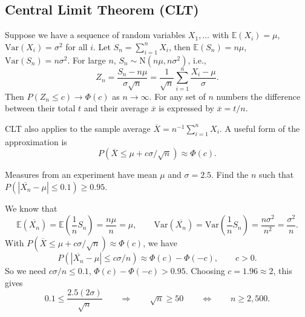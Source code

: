 \documentclass[letter-paper]{tufte-book}
\newenvironment{example}[1][Example]{\begin{trivlist}
\item[\hskip \labelsep {\bfseries #1}]}{\end{trivlist}}
\begin{document}

\subsection{Central Limit Theorem (CLT)}

Suppose we have a sequence of random variables $X_1,\ldots$ with
$\mathbb{E}(X_i) = \mu$, $\mbox{Var}(X_i) = \sigma^2$ for all $i$. Let $S_n =
\sum_{i=1}^n X_i$, then $\mathbb{E}(S_n) = n\mu$, $\mbox{Var}(S_n) = n\sigma^2$.
For large $n$, $S_n \sim \mbox{N}(n\mu, n\sigma^2)$, i.e.,
\begin{equation*}
  Z_n = \frac{S_n - n\mu}{\sigma\sqrt{n}} 
  = \frac{1}{\sqrt{n}}\sum_{i=1}^n \frac{X_i - \mu}{\sigma}.
\end{equation*}
Then $P(Z_n \leq c) \to \Phi(c)$ as $n\to\infty$. For any set of $n$ numbers the
difference between their total $t$ and their average $\overline{x}$ is expressed
by $\overline{x} = t/n$.

CLT also applies to the sample average $\overline{X} = n^{-1} \sum_{i=1}^n X_i$.
A useful form of the approximation is
\begin{equation*}
  P(\overline{X} \leq \mu + c\sigma/\sqrt{n}) \approx \Phi(c).
\end{equation*}

\begin{example}
  Measures from an experiment have mean $\mu$ and $\sigma = 2.5$. Find the $n$
  such that $P(|\overline{X_n} - \mu| \leq 0.1) \geq 0.95$.
  
  We know that
  \begin{equation*}
    \mathbb{E}(\overline{X_n}) = \mathbb{E}\left(\frac{1}{n}S_n\right)
    = \frac{n\mu}{n} = \mu,\qquad
    \mbox{Var}(\overline{X_n}) = \mbox{Var}\left(\frac{1}{n}S_n\right)
    = \frac{n\sigma^2}{n^2} = \frac{\sigma^2}{n}.
  \end{equation*}
  With $P(\overline{X} \leq \mu + c\sigma/\sqrt{n}) \approx \Phi(c)$, we have
  \begin{equation*}
    P(|\overline{X_n} - \mu| \leq c\sigma/n) \approx \Phi(c) - \Phi(-c),
    \qquad c > 0.
  \end{equation*}
  So we need $c\sigma/n \leq 0.1$, $\Phi(c) - \Phi(-c) > 0.95$. Choosing $c =
  1.96 \approx 2$, this gives
  \begin{equation*}
    0.1 \leq \frac{2.5(2\sigma)}{\sqrt{n}} \qquad\Rightarrow\qquad
    \sqrt{n} \geq 50 \qquad\Leftrightarrow\qquad
    n \geq 2,500.
  \end{equation*}
\end{example}
\end{document}
